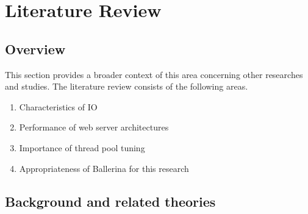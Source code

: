 \chapter{Literature Review}\label{chap:2}

\section{Overview}

This section provides a broader context of this area concerning other researches and studies. The literature review consists of the following areas. 

\begin{enumerate}
	\item Characteristics of IO 
	\item Performance of web server architectures
	\item Importance of thread pool tuning
	\item Appropriateness of Ballerina for this research
	
\end{enumerate}

\section{Background and related theories}

